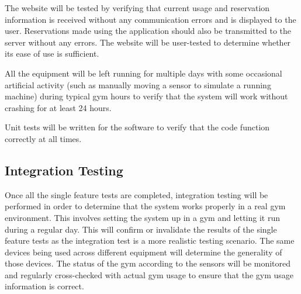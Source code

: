 \documentclass[PPFS.tex]{template/subfiles}
\begin{document}
The website will be tested by verifying that current usage and reservation information is received without any communication errors and is displayed to the user. Reservations made using the application should also be transmitted to the server without any errors. The website will be user-tested to determine whether its ease of use is sufficient.

All the equipment will be left running for multiple days with some occasional artificial activity (such as manually moving a sensor to simulate a running machine) during typical gym hours to verify that the system will work without crashing for at least 24 hours.

Unit tests will be written for the software to verify that the code function correctly at all times.

\subsection{Integration Testing}

Once all the single feature tests are completed, integration testing will be performed in order to determine that the system works properly in a real gym environment. This involves setting the system up in a gym and letting it run during a regular day. This will confirm or invalidate the results of the single feature tests as the integration test is a more realistic testing scenario. The same devices being used across different equipment will determine the generality of those devices. The status of the gym according to the sensors will be monitored and regularly cross-checked with actual gym usage to ensure that the gym usage information is correct.
\end{document}
